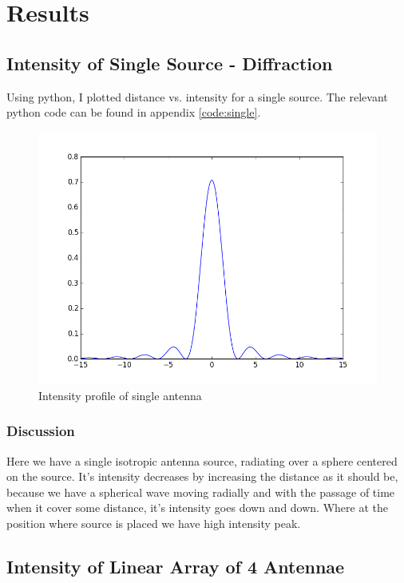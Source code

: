 \chapter{Results}

\section{Intensity of Single Source - Diffraction}

Using python, I plotted distance vs. intensity for a single source. The relevant python code can be found in appendix \ref{code:single}.

\begin{figure}[!h]
\centering	
\includegraphics[scale=0.45]{figure_1.png}
\caption{Intensity profile of single antenna}
\end{figure}

\subsection{Discussion}
Here we have a single isotropic antenna source, radiating over a sphere centered on the source. It's intensity decreases by increasing the distance as it should be, because we have a spherical wave moving radially and with the passage of time when it cover some distance, it's intensity goes down and down. Where at the position where source is placed we have high intensity peak.


\section{Intensity of Linear Array of 4 Antennae}

